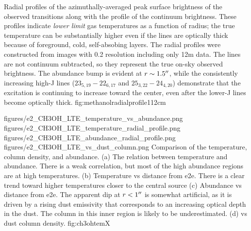 \documentclass{emulateapj}
\begin{document}
{Radial profiles of the azimuthally-averaged peak surface brightness of the
observed \methanol transitions along with the profile of the continuum
brightness.  These profiles indicate \emph{lower limit} gas temperatures
as a function of radius; the true temperature can be substantially higher even
if the lines are optically thick because of foreground, cold, self-absobing layers.
The radial profiles were constructed from images with 0.2\arcsec
resolution including only 12m data.  The lines are not continuum subtracted, so
they represent the true on-sky observed brightness.  The abundance bump is
evident at $r\sim1.5\mbox{$^{\prime\prime}$}$, while the consistently increasing high-J lines
(\methanol $23_{5,19}-22_{6,17}$ and $25_{3,22}-24_{4,20}$) demonstrate that
the excitation is continuing to increase toward the center, even after the
lower-J lines become optically thick.
}
{fig:methanolradialprofile}{1}{12cm}

\FigureFour
{figures/e2_CH3OH_LTE_temperature_vs_abundance.png}
{figures/e2_CH3OH_LTE_temperature_radial_profile.png}
{figures/e2_CH3OH_LTE_abundance_radial_profile.png}
{figures/e2_CH3OH_LTE_vs_dust_column.png}
{Comparison of the \methanol temperature, column density, and abundance.
(a) The relation between temperature and abundance.  There is a weak correlation,
but most of the high abundance regions are at high temperatures.
(b) Temperature vs distance from e2e.  There is a clear trend toward higher
temperatures closer  to the central source
(c) Abundance vs distance from e2e.  The apparent dip at $r<1\mbox{$^{\prime\prime}$}$ is
somewhat artificial, as it is driven by a rising dust emissivity that
corresponds to an increasing optical depth in the dust.  The \methanol column
in this inner region is likely to be underestimated. 
(d) \methanol vs dust column density.  }
{fig:ch3ohtemX}
\end{document}
